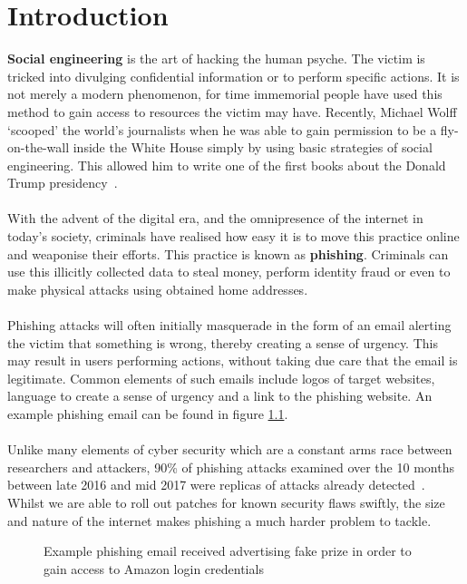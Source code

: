 \documentclass[12pt,twoside]{report}
\begin{document}
\chapter{Introduction}
\textbf{Social engineering} is the art of hacking the human psyche. The victim is tricked into divulging confidential information or to perform specific actions. It is not merely a modern phenomenon, for time immemorial people have used this method to gain access to resources the victim may have. Recently, Michael Wolff `scooped' the world's journalists when he was able to gain permission to be a fly-on-the-wall inside the White House simply by using basic strategies of social engineering. This allowed him to write one of the first books about the Donald Trump presidency~\cite{whitehouse}.
\\\\
With the advent of the digital era, and the omnipresence of the internet in today's society, criminals have realised how easy it is to move this practice online and weaponise their efforts. This practice is known as \textbf{phishing}.
Criminals can use this illicitly collected data to steal money, perform identity fraud or even to make physical attacks using obtained home addresses.
\\\\
Phishing attacks will often initially masquerade in the form of an email alerting the victim that something is wrong, thereby creating a sense of urgency. This may result in users performing actions, without taking due care that the email is legitimate. Common elements of such emails include logos of target websites, language to create a sense of urgency and a link to the phishing website. An example phishing email can be found in figure \ref{fig:phishingemail}.
\\\\
Unlike many elements of cyber security which are a constant arms race between researchers and attackers, 90\% of phishing attacks examined over the 10 months between late 2016 and mid 2017 were replicas of attacks already detected~\cite{phishingovertime}. Whilst we are able to roll out patches for known security flaws swiftly, the size and nature of the internet makes phishing a much harder problem to tackle.
\\
\begin{figure}[!h]
  \begin{center}
  \end{center}
  \caption{Example phishing email received advertising fake prize in order to gain access to Amazon login credentials}
  \label{fig:phishingemail}
\end{figure}
\end{document}
